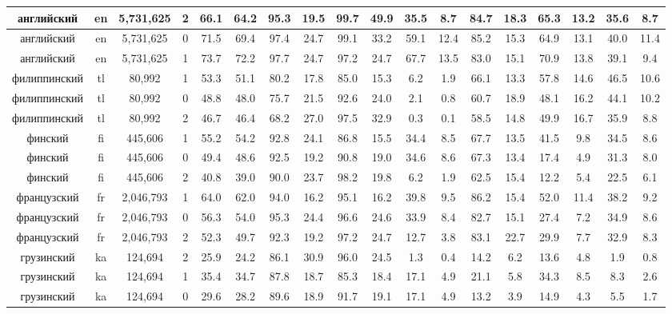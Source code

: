 \begin{table*}
{\begin{tabular}{|c|c|c|c||c|c|c|c|c|c|c|c|c|c|c|c|c|c|}
английский & en & 5,731,625 & 2 & 66.1 & 64.2 & 95.3 & 19.5 & 99.7 & 49.9 & 35.5 & 8.7 & 84.7 & 18.3 & 65.3 & 13.2 & 35.6 & 8.7\\ \hline
английский & en & 5,731,625 & 0 & 71.5 & 69.4 & 97.4 & 24.7 & 99.1 & 33.2 & 59.1 & 12.4 & 85.2 & 15.3 & 64.9 & 13.1 & 40.0 & 11.4\\ \hline
английский & en & 5,731,625 & 1 & 73.7 & 72.2 & 97.7 & 24.7 & 97.2 & 24.7 & 67.7 & 13.5 & 83.0 & 15.1 & 70.9 & 13.8 & 39.1 & 9.4\\ \hline
филиппинский & tl & 80,992 & 1 & 53.3 & 51.1 & 80.2 & 17.8 & 85.0 & 15.3 & 6.2 & 1.9 & 66.1 & 13.3 & 57.8 & 14.6 & 46.5 & 10.6\\ \hline
филиппинский & tl & 80,992 & 0 & 48.8 & 48.0 & 75.7 & 21.5 & 92.6 & 24.0 & 2.1 & 0.8 & 60.7 & 18.9 & 48.1 & 16.2 & 44.1 & 10.2\\ \hline
филиппинский & tl & 80,992 & 2 & 46.7 & 46.4 & 68.2 & 27.0 & 97.5 & 32.9 & 0.3 & 0.1 & 58.5 & 14.8 & 49.9 & 16.7 & 35.9 & 8.8\\ \hline
финский & fi & 445,606 & 1 & 55.2 & 54.2 & 92.8 & 24.1 & 86.8 & 15.5 & 34.4 & 8.5 & 67.7 & 13.5 & 41.5 & 9.8 & 34.5 & 8.6\\ \hline
финский & fi & 445,606 & 0 & 49.4 & 48.6 & 92.5 & 19.2 & 90.8 & 19.0 & 34.6 & 8.6 & 67.3 & 13.4 & 17.4 & 4.9 & 31.3 & 8.0\\ \hline
финский & fi & 445,606 & 2 & 40.8 & 39.0 & 90.0 & 23.7 & 98.2 & 19.8 & 6.2 & 1.9 & 62.5 & 15.4 & 12.2 & 5.4 & 22.5 & 6.1\\ \hline
французский & fr & 2,046,793 & 1 & 64.0 & 62.0 & 94.0 & 16.2 & 95.1 & 16.2 & 39.8 & 9.5 & 86.2 & 15.4 & 52.0 & 11.4 & 38.2 & 9.2\\ \hline
французский & fr & 2,046,793 & 0 & 56.3 & 54.0 & 95.3 & 24.4 & 96.6 & 24.6 & 33.9 & 8.4 & 82.7 & 15.1 & 27.4 & 7.2 & 34.9 & 8.6\\ \hline
французский & fr & 2,046,793 & 2 & 52.3 & 49.7 & 92.3 & 19.2 & 97.2 & 24.7 & 12.7 & 3.8 & 83.1 & 22.7 & 29.9 & 7.7 & 32.9 & 8.3\\ \hline
грузинский & ka & 124,694 & 2 & 25.9 & 24.2 & 86.1 & 30.9 & 96.0 & 24.5 & 1.3 & 0.4 & 14.2 & 6.2 & 13.6 & 4.8 & 1.9 & 0.8\\ \hline
грузинский & ka & 124,694 & 1 & 35.4 & 34.7 & 87.8 & 18.7 & 85.3 & 18.4 & 17.1 & 4.9 & 21.1 & 5.8 & 34.3 & 8.5 & 8.3 & 2.6\\ \hline
грузинский  & ka & 124,694 & 0 & 29.6 & 28.2 & 89.6 & 18.9 & 91.7 & 19.1 & 17.1 & 4.9 & 13.2 & 3.9 & 14.9 & 4.3 & 5.5 & 1.7\\ \hline

\end{tabular}}
\end{table*}
